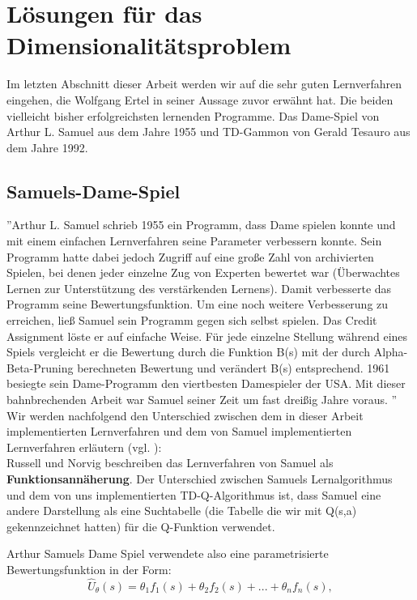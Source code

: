 \section{Lösungen für das Dimensionalitätsproblem}
\label{sec:Ausblick}
Im letzten Abschnitt dieser Arbeit werden wir auf die sehr guten Lernverfahren eingehen, die Wolfgang Ertel in seiner Aussage zuvor erwähnt hat. Die beiden vielleicht bisher erfolgreichsten lernenden Programme. Das Dame-Spiel von Arthur L. Samuel aus dem Jahre 1955 und TD-Gammon von Gerald Tesauro aus dem Jahre 1992. 

\subsection{Samuels-Dame-Spiel}
''Arthur L. Samuel schrieb 1955 ein Programm, dass Dame spielen konnte und mit einem einfachen Lernverfahren seine Parameter verbessern konnte. Sein Programm hatte dabei jedoch Zugriff auf eine große Zahl von archivierten Spielen, bei denen jeder einzelne Zug von Experten bewertet war (Überwachtes Lernen zur Unterstützung des verstärkenden Lernens). Damit verbesserte das Programm seine Bewertungsfunktion. Um eine noch weitere Verbesserung zu erreichen, ließ Samuel sein Programm gegen sich selbst spielen. Das Credit Assignment löste er auf einfache Weise. Für jede einzelne Stellung während eines Spiels vergleicht er die Bewertung durch die Funktion B(s) mit der durch Alpha-Beta-Pruning berechneten Bewertung und verändert B(s) entsprechend. 1961 besiegte sein Dame-Programm den viertbesten Damespieler der USA. Mit dieser bahnbrechenden Arbeit war Samuel seiner Zeit um fast dreißig Jahre voraus. \cite[120\psq]{Ertel}''\\

Wir werden nachfolgend den Unterschied zwischen dem in dieser Arbeit implementierten Lernverfahren und dem von Samuel implementierten Lernverfahren erläutern (vgl. \cite[976]{Russell}): \\

Russell und Norvig beschreiben das Lernverfahren von Samuel als \textbf{Funktionsannäherung}. Der Unterschied zwischen Samuels Lernalgorithmus und dem von uns implementierten TD-Q-Algorithmus ist, dass Samuel eine andere Darstellung als eine Suchtabelle (die Tabelle die wir mit Q(s,a) gekennzeichnet hatten) für die Q-Funktion verwendet.
\newpage

Arthur Samuels Dame Spiel verwendete also eine parametrisierte Bewertungsfunktion in der Form: \\
\begin{equation*}
\hat{U}_\theta(s) = \theta_1 f_1(s) + \theta_2 f_2(s) + ... + \theta_n f_n(s),
\end{equation*}

